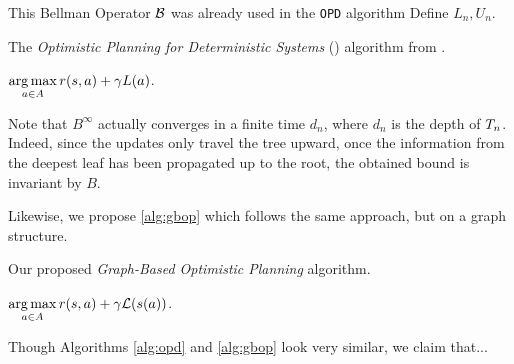 \documentclass[runningheads]{llncs}
\begin{document}
This Bellman Operator $\mathcal{B}$ was already used in the \texttt{OPD} algorithm \citet{hren2008optimistic}
Define $L_n, U_n$.

\begin{algorithm}
	\caption{The \emph{Optimistic Planning for Deterministic Systems} (\OPD) algorithm from \citep{hren2008optimistic}.}
	\label{alg:opd}
	\DontPrintSemicolon
	\Return $\displaystyle\operatorname*{arg\,max}_{a\in A} r(s, a) + \gamma L(a)$. \;
\end{algorithm}

Note that $B^\infty$ actually converges in a finite time $d_n$, where $d_n$ is the depth of $T_n$. Indeed, since the updates only travel the tree upward, once the information from the deepest leaf has been propagated up to the root, the obtained bound is invariant by $B$.

Likewise, we propose \autoref{alg:gbop} which follows the same approach, but on a graph structure.

\begin{algorithm}
	\caption{Our proposed \emph{Graph-Based Optimistic Planning} algorithm.}
	\label{alg:gbop}
	\DontPrintSemicolon
	\Return $\displaystyle\operatorname*{arg\,max}_{a\in A} r(s,a) + \gamma \mathcal{L}(s(a))$. 
\end{algorithm}

Though Algorithms \ref{alg:opd} and \ref{alg:gbop} look very similar, we claim that...
\end{document}
